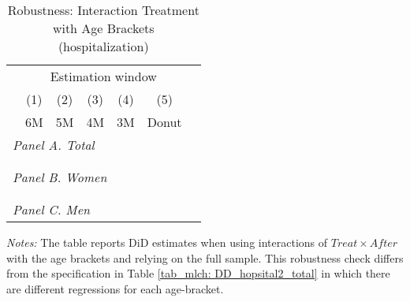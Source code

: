 \vspace*{\fill}
\begin{table}[H] \centering 
	\begin{threeparttable} \centering \caption{Robustness: Interaction Treatment with Age Brackets (hospitalization)}\label{tab_mlch: interaction_TxA_agegroups_hospital2}
		{\def\sym#1{\ifmmode^{#1}\else\(^{#1}\)\fi} 
			\begin{tabular}{l*{6}{c}}
				\toprule 
				& \multicolumn{5}{c}{Estimation window} \\ 
				\cmidrule(lr){2-6}
				&\multicolumn{1}{c}{(1)}&\multicolumn{1}{c}{(2)}&\multicolumn{1}{c}{(3)}&\multicolumn{1}{c}{(4)}&\multicolumn{1}{c}{(5)}\\
				&\multicolumn{1}{c}{6M}&\multicolumn{1}{c}{5M}&\multicolumn{1}{c}{4M}&\multicolumn{1}{c}{3M}&\multicolumn{1}{c}{Donut}\\
				\midrule
				\multicolumn{5}{l}{\emph{Panel A. Total}} \\
				 \\ \\
				
				\multicolumn{5}{l}{\emph{Panel B. Women}} \\
				 \\ \\
				
				\multicolumn{5}{l}{\emph{Panel C. Men}} \\
				 				
				\bottomrule 
		\end{tabular}}
		\begin{tablenotes} 
			\item \scriptsize \emph{Notes:} The table reports DiD estimates when using interactions of $Treat \times After$ with the age brackets and relying on the full sample. This robustness check differs from the specification in Table \ref{tab_mlch: DD_hopsital2_total} in which there are different regressions for each age-bracket. 			
		\end{tablenotes}
	\end{threeparttable} 
\end{table}
\vspace*{\fill}\clearpage 
\restoregeometry













